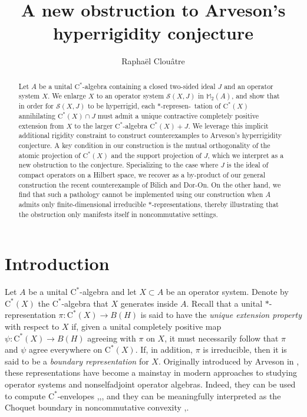 \documentclass[10pt]{amsart}
\author{Rapha\"el Clou\^atre}
\title[A new obstruction to Arveson's conjecture]{A new obstruction to Arveson's hyperrigidity conjecture}
\newcommand{\bM}{{\mathbb{M}}}
\renewcommand{\S}{{\mathcal{S}}}
\newcommand{\rC}{\mathrm{C}}
\theoremstyle{definition}
\begin{document}
\begin{abstract}
Let $A$ be a unital $\rC^*$-algebra containing a closed two-sided ideal $J$ and an operator system $X$. We enlarge $X$ to an operator system $\S(X,J)$  in $\bM_2(A)$, and show that in order for $\S(X,J)$ to be hyperrigid,  each $*$-represen-\ tation of $\rC^*(X)$ annihilating $\rC^*(X)\cap J$ must admit a unique contractive completely positive extension from $X$ to the larger $\rC^*$-algebra $\rC^*(X)+J$.  We leverage this implicit additional rigidity constraint to construct counterexamples to Arveson's hyperrigidity conjecture. A key condition in our construction is the mutual orthogonality of the atomic projection of $\rC^*(X)$ and the support projection of $J$, which we  interpret as a new obstruction to the conjecture. Specializing to the case where $J$ is the ideal of compact operators on a Hilbert space, we recover as a by-product of our general construction the recent counterexample of Bilich and Dor-On. On the other hand, we find that such a pathology cannot be implemented using our construction when $A$ admits only finite-dimensional irreducible $*$-representations, thereby illustrating that the obstruction only manifests itself in  noncommutative settings.
\end{abstract}
\maketitle

\section{Introduction}

Let $A$ be a unital $\rC^*$-algebra and let $X\subset A$ be an operator system. Denote by $\rC^*(X)$ the $\rC^*$-algebra that $X$ generates inside $A$. Recall that a unital $*$-representation $\pi:\rC^*(X)\to B(H)$ is said to have the \emph{unique extension property} with respect to $X$ if, given a unital completely positive map $\psi:\rC^*(X)\to B(H)$ agreeing with $\pi$ on $X$, it must necessarily follow that $\pi$ and $\psi$ agree everywhere on $\rC^*(X)$. If, in addition, $\pi$ is irreducible, then it is said to be a \emph{boundary representation} for $X$. Originally introduced by Arveson in \cite{arveson1969}, these representations have become a mainstay in modern approaches to studying operator systems and nonselfadjoint operator algebras. Indeed, they can be used to compute $\rC^*$-envelopes \cite{dritschel2005boundary},\cite{arveson2008noncommutative},\cite{davidson2015choquet}, and they can be meaningfully  interpreted as the Choquet boundary in noncommutative convexity \cite{kleski2014boundary},\cite{davidson2019noncommutative}.
\end{document}
